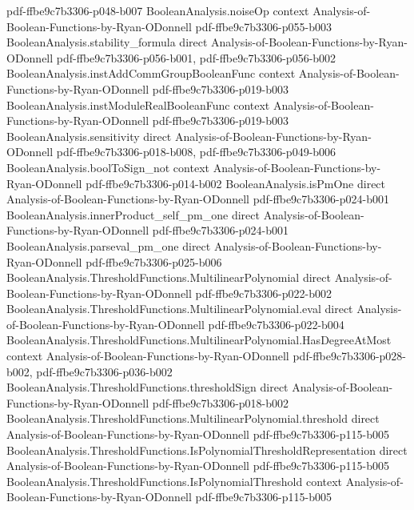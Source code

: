 \begin{theorem}
  {pdf-ffbe9c7b3306-p048-b007}
\proofstep
  {BooleanAnalysis.noiseOp}
  {context}
  {Analysis-of-Boolean-Functions-by-Ryan-ODonnell}
  {pdf-ffbe9c7b3306-p055-b003}
\proofstep
  {BooleanAnalysis.stability_formula}
  {direct}
  {Analysis-of-Boolean-Functions-by-Ryan-ODonnell}
  {pdf-ffbe9c7b3306-p056-b001,
    pdf-ffbe9c7b3306-p056-b002}
\proofstep
  {BooleanAnalysis.instAddCommGroupBooleanFunc}
  {context}
  {Analysis-of-Boolean-Functions-by-Ryan-ODonnell}
  {pdf-ffbe9c7b3306-p019-b003}
\proofstep
  {BooleanAnalysis.instModuleRealBooleanFunc}
  {context}
  {Analysis-of-Boolean-Functions-by-Ryan-ODonnell}
  {pdf-ffbe9c7b3306-p019-b003}
\proofstep
  {BooleanAnalysis.sensitivity}
  {direct}
  {Analysis-of-Boolean-Functions-by-Ryan-ODonnell}
  {pdf-ffbe9c7b3306-p018-b008,
    pdf-ffbe9c7b3306-p049-b006}
\proofstep
  {BooleanAnalysis.boolToSign_not}
  {context}
  {Analysis-of-Boolean-Functions-by-Ryan-ODonnell}
  {pdf-ffbe9c7b3306-p014-b002}
\proofstep
  {BooleanAnalysis.isPmOne}
  {direct}
  {Analysis-of-Boolean-Functions-by-Ryan-ODonnell}
  {pdf-ffbe9c7b3306-p024-b001}
\proofstep
  {BooleanAnalysis.innerProduct_self_pm_one}
  {direct}
  {Analysis-of-Boolean-Functions-by-Ryan-ODonnell}
  {pdf-ffbe9c7b3306-p024-b001}
\proofstep
  {BooleanAnalysis.parseval_pm_one}
  {direct}
  {Analysis-of-Boolean-Functions-by-Ryan-ODonnell}
  {pdf-ffbe9c7b3306-p025-b006}
\proofstep
  {BooleanAnalysis.ThresholdFunctions.MultilinearPolynomial}
  {direct}
  {Analysis-of-Boolean-Functions-by-Ryan-ODonnell}
  {pdf-ffbe9c7b3306-p022-b002}
\proofstep
  {BooleanAnalysis.ThresholdFunctions.MultilinearPolynomial.eval}
  {direct}
  {Analysis-of-Boolean-Functions-by-Ryan-ODonnell}
  {pdf-ffbe9c7b3306-p022-b004}
\proofstep
  {BooleanAnalysis.ThresholdFunctions.MultilinearPolynomial.HasDegreeAtMost}
  {context}
  {Analysis-of-Boolean-Functions-by-Ryan-ODonnell}
  {pdf-ffbe9c7b3306-p028-b002,
    pdf-ffbe9c7b3306-p036-b002}
\proofstep
  {BooleanAnalysis.ThresholdFunctions.thresholdSign}
  {direct}
  {Analysis-of-Boolean-Functions-by-Ryan-ODonnell}
  {pdf-ffbe9c7b3306-p018-b002}
\proofstep
  {BooleanAnalysis.ThresholdFunctions.MultilinearPolynomial.threshold}
  {direct}
  {Analysis-of-Boolean-Functions-by-Ryan-ODonnell}
  {pdf-ffbe9c7b3306-p115-b005}
\proofstep
  {BooleanAnalysis.ThresholdFunctions.IsPolynomialThresholdRepresentation}
  {direct}
  {Analysis-of-Boolean-Functions-by-Ryan-ODonnell}
  {pdf-ffbe9c7b3306-p115-b005}
\proofstep
  {BooleanAnalysis.ThresholdFunctions.IsPolynomialThreshold}
  {context}
  {Analysis-of-Boolean-Functions-by-Ryan-ODonnell}
  {pdf-ffbe9c7b3306-p115-b005}
\proofstep

\end{theorem}
